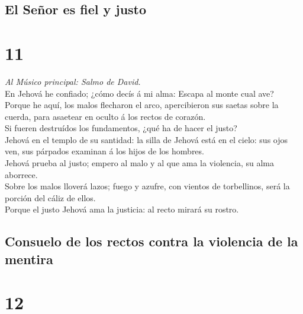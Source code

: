 \hypertarget{el-seuxf1or-es-fiel-y-justo}{%
\subsection{El Señor es fiel y
justo}\label{el-seuxf1or-es-fiel-y-justo}}

\hypertarget{section-10}{%
\section{11}\label{section-10}}

 \emph{Al Músico principal: Salmo de David.}\\
En Jehová he confiado; ¿cómo decís á mi alma: Escapa al monte cual
ave?\\
 Porque he aquí, los malos flecharon el arco, apercibieron
sus saetas sobre la cuerda, para asaetear en oculto á los rectos de
corazón.\\
 Si fueren destruídos los fundamentos, ¿qué ha de hacer el
justo?\\
 Jehová en el templo de su santidad: la silla de Jehová está
en el cielo: sus ojos ven, sus párpados examinan á los hijos de los
hombres.\\
 Jehová prueba al justo; empero al malo y al que ama la
violencia, su alma aborrece.\\
 Sobre los malos lloverá lazos; fuego y azufre, con vientos
de torbellinos, será la porción del cáliz de ellos.\\
 Porque el justo Jehová ama la justicia: al recto mirará su
rostro.

\hypertarget{consuelo-de-los-rectos-contra-la-violencia-de-la-mentira}{%
\subsection{Consuelo de los rectos contra la violencia de la
mentira}\label{consuelo-de-los-rectos-contra-la-violencia-de-la-mentira}}

\hypertarget{section-11}{%
\section{12}\label{section-11}}

